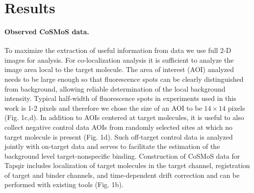 \section*{Results}
\paragraph{Observed CoSMoS data.} %
To maximize the extraction of useful information from data we use full 2-D images for analysis. For co-localization analysis it is sufficient to analyze the image area local to the target molecule. The area of interest (AOI) analyzed needs to be large enough so that fluorescence spots can be clearly distinguished from background, allowing  reliable  determination of the  local  background  intensity. Typical half-width of fluorescence spots in experiments used in this work is 1-2 pixels and therefore we chose the size of an AOI to be $14\times14$ pixels (Fig. 1c,d). In addition to AOIs centered at target molecules, it is useful to also collect negative control data AOIs from randomly selected sites at which no target molecule is present (Fig. 1d). Such off-target control data is analyzed jointly with on-target data and serves to facilitate the estimation of the background level target-nonspecific binding. Construction of CoSMoS data for Tapqir includes localization of target molecules in the target channel, registration of target and binder channels, and time-dependent drift correction and can be performed with existing tools \cite{Friedman2015-nx, Smith2019-yb} (Fig. 1b).


